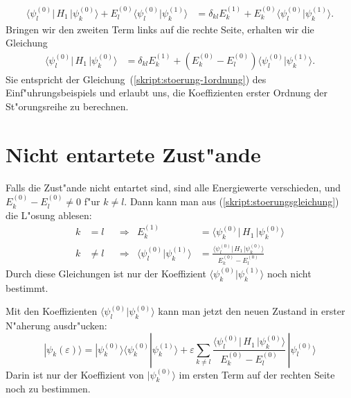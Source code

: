 \begin{align*}
\langle \psi_l^{(0)}|\, H_1 \,|\psi_k^{(0)}\rangle
+
E_l^{(0)}\langle \psi_l^{(0)}|\psi_k^{(1)}\rangle
&=
\delta_{kl} E_k^{(1)}
+
E_k^{(0)}\langle\psi_l^{(0)}|\psi_k^{(1)}\rangle.
\end{align*}
Bringen wir den zweiten Term links auf die rechte Seite, erhalten wir
die Gleichung
\begin{align}
\langle \psi_l^{(0)}|\, H_1 \,|\psi_k^{(0)}\rangle
&=
\delta_{kl} E_k^{(1)}
+
(E_k^{(0)}-E_l^{(0)})\langle\psi_l^{(0)}|\psi_k^{(1)}\rangle.
\label{skript:stoerungsgleichung}
\end{align}
Sie entspricht der Gleichung~(\ref{skript:stoerung-1ordnung})
des Einf"uhrungsbeispiels und erlaubt uns, die Koeffizienten
erster Ordnung der St"orungsreihe zu berechnen.

\section{Nicht entartete Zust"ande\label{section:nichtentartetezustaende}}
Falls die Zust"ande nicht entartet sind, sind alle Energiewerte
verschieden, und $E_k^{(0)}-E_l^{(0)}\ne 0$ f"ur $k\ne l$. 
Dann kann man aus (\ref{skript:stoerungsgleichung}) die L"osung ablesen:
\begin{equation}
\begin{aligned}
k&=l
&&\Rightarrow&
E_k^{(1)}
&=
\langle \psi_k^{(0)}|\, H_1 \,|\psi_k^{(0)}\rangle
\\
k&\ne l
&&\Rightarrow&
\langle\psi_l^{(0)}|\psi_k^{(1)}\rangle
&=
\frac{\langle \psi_l^{(0)}|\, H_1 \,|\psi_k^{(0)}\rangle}{E_k^{(0)}-E_l^{(0)}}
\end{aligned}
\label{skript:stoerungsloesung1ordnung}
\end{equation}
Durch diese Gleichungen ist nur der Koeffizient
$\langle\psi_k^{(0)}|\psi_k^{(1)}\rangle$
noch nicht bestimmt.

Mit den Koeffizienten $\langle\psi_l^{(0)}|\psi_k^{(0)}\rangle$ kann
man jetzt den neuen Zustand in erster N"aherung ausdr"ucken:
\begin{equation}
|\psi_k(\varepsilon)\rangle
=
|\psi_k^{(0)}\rangle
\langle\psi_k^{(0)}|\psi_k^{(1)}\rangle
+\varepsilon
\sum_{k\ne l}
\frac{\langle \psi_l^{(0)}|\, H_1 \,|\psi_k^{(0)}\rangle}{E_k^{(0)}-E_l^{(0)}}
\,
|\psi_l^{(0)}\rangle
\end{equation}
Darin ist nur der Koeffizient von $|\psi_k^{(0)}\rangle$ im ersten
Term auf der rechten Seite noch zu bestimmen.

